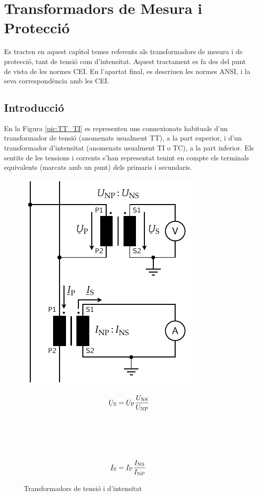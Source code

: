 \chapter{Transformadors de Mesura i Protecci\'{o}}

Es tracten en aquest cap\'{\i}tol temes referents als transformadors de
mesura i de protecci\'{o}, tant de tensi\'{o} com d'intensitat. Aquest
tractament es fa des del punt de vista de les normes \textsf{CEI}.
En l'apartat final, es descriuen les normes \textsf{ANSI}, i la seva
correspond\`{e}ncia amb les \textsf{\textsf{CEI}}.

\section{Introducci\'{o}}

En la Figura \vref{pic:TT_TI} es representen uns connexionats
habituals d'un transformador de tensi\'{o} (anomenats usualment TT), a
la part superior, i d'un transformador d'intensitat (anomenats
usualment TI o TC), a la part inferior. Els sentits de les tensions
i corrents s'han representat tenint en compte els terminals
equivalents (marcats amb un punt) dels primaris i secundaris.

\begin{figure}[h!]
\hfill
\begin{minipage}[b]{85mm}
\hspace{1.5cm}
    \includegraphics{Imatges/Cap-TrafosMesProt-TI-TT.pdf}
\caption{Transformadors de tensi\'{o} i d'intensitat} \label{pic:TT_TI}
\end{minipage}
\hfill
\begin{minipage}[b][70mm][t]{50mm}
   \begin{align}
      \cmplx{U}\ped{S} &= \cmplx{U}\ped{P} \frac{U\ped{NS}}{U\ped{NP}}
      \\[24mm]
      \cmplx{I}\ped{S} &= \cmplx{I}\ped{P} \frac{I\ped{NS}}{I\ped{NP}}
   \end{align}
\end{minipage}
\end{figure}

